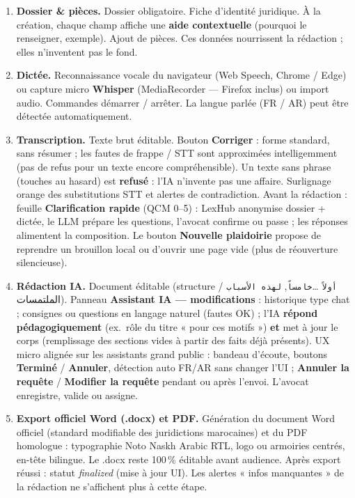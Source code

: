 \begin{enumerate}[leftmargin=1.4em]
  \item \textbf{Dossier \& pièces.} Dossier obligatoire. Fiche d'identité juridique. À la création, chaque champ affiche une \textbf{aide contextuelle} (pourquoi le renseigner, exemple). Ajout de pièces. Ces données nourrissent la rédaction ; elles n'inventent pas le fond.
  \item \textbf{Dictée.} Reconnaissance vocale du navigateur (Web Speech, Chrome / Edge) ou capture micro \textbf{Whisper} (MediaRecorder --- Firefox inclus) ou import audio. Commandes démarrer / arrêter. La langue parlée (FR / AR) peut être détectée automatiquement.
  \item \textbf{Transcription.} Texte brut éditable. Bouton \textbf{Corriger} : forme standard, sans résumer ; les fautes de frappe / STT sont approximées intelligemment (pas de refus pour un texte encore compréhensible). Un texte sans phrase (touches au hasard) est \textbf{refusé} : l'IA n'invente pas une affaire. Surlignage orange des substitutions STT et alertes de contradiction. Avant la rédaction : feuille \textbf{Clarification rapide} (QCM 0--5) : LexHub anonymise dossier + dictée, le LLM prépare les questions, l'avocat confirme ou passe ; les réponses alimentent la composition. Le bouton \textbf{Nouvelle plaidoirie} propose de reprendre un brouillon local ou d'ouvrir une page vide (plus de réouverture silencieuse).
  \item \textbf{Rédaction IA.} Document éditable (structure \texttt{أولاً} \ldots \texttt{خامساً}, \texttt{لهذه الأسباب} / الملتمسات). Panneau \textbf{Assistant IA --- modifications} : historique type chat ; consignes ou questions en langage naturel (fautes OK) ; l'IA \textbf{répond pédagogiquement} (ex.\ rôle du titre « pour ces motifs ») \textbf{et} met à jour le corps (remplissage des sections vides à partir des faits déjà présents). UX micro alignée sur les assistants grand public : bandeau d'écoute, boutons \textbf{Terminé} / \textbf{Annuler}, détection auto FR/AR sans changer l'UI ; \textbf{Annuler la requête} / \textbf{Modifier la requête} pendant ou après l'envoi. L'avocat enregistre, valide ou assigne.
  \item \textbf{Export officiel Word (.docx) et PDF.} Génération du document Word officiel (standard modifiable des juridictions marocaines) et du PDF homologue : typographie Noto Naskh Arabic RTL, logo ou armoiries centrés, en-tête bilingue. Le .docx reste 100\,\% éditable avant audience. Après export réussi : statut \textit{finalized} (mise à jour UI). Les alertes « infos manquantes » de la rédaction ne s'affichent plus à cette étape.
\end{enumerate}

